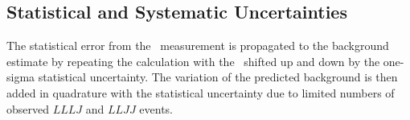 

\subsection{Statistical and Systematic Uncertainties}

The statistical error from the \ffactor\ measurement is propagated to the
background estimate by repeating the calculation with the \ffactor\ shifted up and down
by the one-sigma statistical uncertainty. The variation of the predicted
background is then added in quadrature with the statistical uncertainty due to
limited numbers of observed $LLLJ$ and $LLJJ$ events. 

